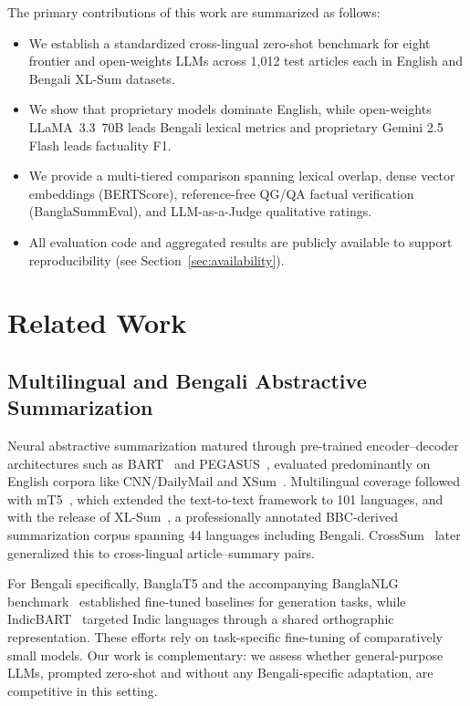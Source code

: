 \documentclass[runningheads]{llncs}
\begin{document}
The primary contributions of this work are summarized as follows:
\begin{itemize}
    \item We establish a standardized cross-lingual zero-shot benchmark for eight frontier and open-weights LLMs across 1,012 test articles each in English and Bengali XL-Sum datasets.
    \item We show that proprietary models dominate English, while open-weights LLaMA~3.3~70B leads Bengali lexical metrics and proprietary Gemini 2.5 Flash leads factuality F1.
    \item We provide a multi-tiered comparison spanning lexical overlap, dense vector embeddings (BERTScore), reference-free QG/QA factual verification (BanglaSummEval), and LLM-as-a-Judge qualitative ratings.
    \item All evaluation code and aggregated results are publicly available to support reproducibility (see Section~\ref{sec:availability}).
\end{itemize}

%
%
\section{Related Work}\label{sec:related}

\subsection{Multilingual and Bengali Abstractive Summarization}

Neural abstractive summarization matured through pre-trained encoder--decoder
architectures such as BART~\cite{lewis2020} and PEGASUS~\cite{zhang2020pegasus},
evaluated predominantly on English corpora like CNN/DailyMail and
XSum~\cite{narayan2018}. Multilingual coverage followed with
mT5~\cite{xue2021}, which extended the text-to-text framework to 101 languages,
and with the release of XL-Sum~\cite{hasan2021}, a professionally annotated
BBC-derived summarization corpus spanning 44 languages including Bengali.
CrossSum~\cite{hasan2023} later generalized this to cross-lingual
article--summary pairs.

For Bengali specifically, BanglaT5 and the accompanying BanglaNLG
benchmark~\cite{bhattacharjee2023} established fine-tuned baselines for
generation tasks, while IndicBART~\cite{dabre2022} targeted Indic languages
through a shared orthographic representation. These efforts rely on
task-specific fine-tuning of comparatively small models. Our work is
complementary: we assess whether general-purpose LLMs, prompted zero-shot and
without any Bengali-specific adaptation, are competitive in this setting.
\end{document}

